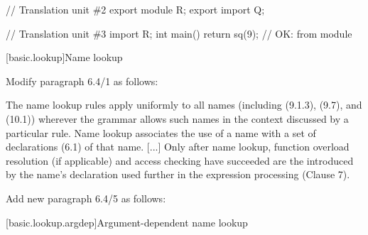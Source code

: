\begin{std.txt}
\begin{codeblock}
    // Translation unit \#2
    export module R;
    export import Q;

    // Translation unit \#3
    import R;
    int main() { return sq(9); }       // OK:  from module 
    \end{codeblock}
    \added{
    \exitexample
   \exitnote}
\end{std.txt}


\setcounter{section}{3}
[basic.lookup]{Name lookup}

Modify paragraph 6.4/1 as follows:
\begin{std.txt}
  \pnum[1]
  The name lookup rules apply uniformly to all names
  (including  (9.1.3),
   (9.7), and 
   (10.1))
  wherever the grammar allows such names in the context discussed by a 
  particular rule.
  Name lookup associates the use of a name with a set of declarations (6.1)
  of that name.
  [...] Only after name lookup, function overload resolution (if applicable)
  and access checking have succeeded are the
   introduced by
  the name's declaration
  used further in the expression processing (Clause 7).
\end{std.txt}

\begin{before}
Add new paragraph 6.4/5 as follows:
\begin{std.txt}\color{addclr}
  \pnum[5]
\end{std.txt}
\end{before}

\setcounter{subsection}{1}
[basic.lookup.argdep]{Argument-dependent name lookup}

